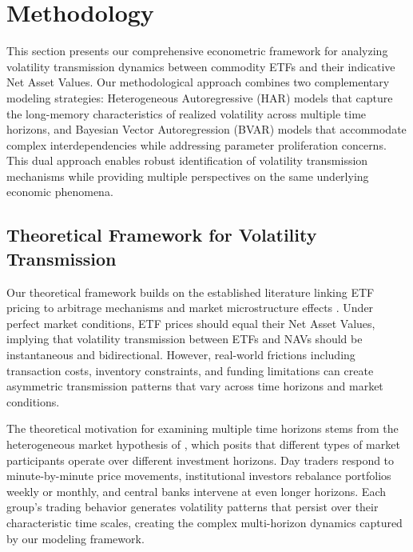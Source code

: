 
\section{Methodology} \label{sec:methodology}

This section presents our comprehensive econometric framework for analyzing volatility transmission dynamics between commodity ETFs and their indicative Net Asset Values. Our methodological approach combines two complementary modeling strategies: Heterogeneous Autoregressive (HAR) models that capture the long-memory characteristics of realized volatility across multiple time horizons, and Bayesian Vector Autoregression (BVAR) models that accommodate complex interdependencies while addressing parameter proliferation concerns. This dual approach enables robust identification of volatility transmission mechanisms while providing multiple perspectives on the same underlying economic phenomena.

\subsection{Theoretical Framework for Volatility Transmission}

Our theoretical framework builds on the established literature linking ETF pricing to arbitrage mechanisms and market microstructure effects \citep{ackert2000arbitrage, petajisto2017inefficiencies}. Under perfect market conditions, ETF prices should equal their Net Asset Values, implying that volatility transmission between ETFs and NAVs should be instantaneous and bidirectional. However, real-world frictions including transaction costs, inventory constraints, and funding limitations can create asymmetric transmission patterns that vary across time horizons and market conditions.

The theoretical motivation for examining multiple time horizons stems from the heterogeneous market hypothesis of \citet{muller1997volatilities}, which posits that different types of market participants operate over different investment horizons. Day traders respond to minute-by-minute price movements, institutional investors rebalance portfolios weekly or monthly, and central banks intervene at even longer horizons. Each group's trading behavior generates volatility patterns that persist over their characteristic time scales, creating the complex multi-horizon dynamics captured by our modeling framework.


